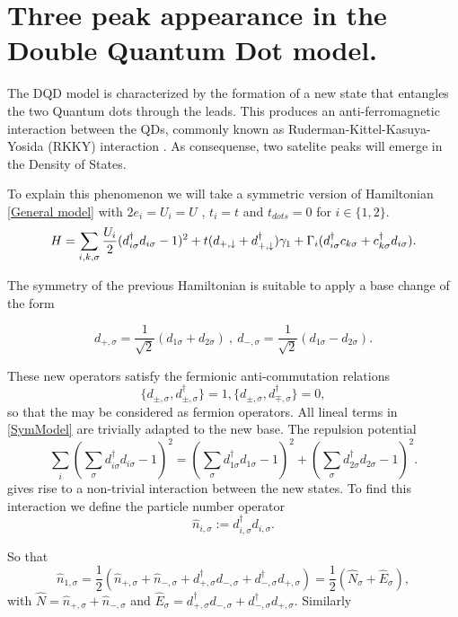 \chapter{Three peak appearance in the Double Quantum Dot model.\label{chap:DoublePeak.}}

The DQD model is characterized by the formation of 
a new state that entangles the two Quantum dots through the leads. This produces an anti-ferromagnetic interaction between the QDs, commonly known
as Ruderman-Kittel-Kasuya-Yosida (RKKY) interaction \citep{ruderman_indirect_1954,yosida_magnetic_1957}. As consequense, two satelite peaks will emerge in the Density of States.  




To explain this phenomenon we will take a symmetric version of Hamiltonian \eqref{General model} with $2e_i =U_i =U $ , $t_i = t$ and $t_{dots} = 0$ for $i \in \{ 1,2 \}$. 
\begin{equation}
H =\sum_{i,k,\sigma}  \frac{U_i}{2}(d_{i \sigma}^{\dagger}d_{i \sigma}-1)^{2} + t(d_{+,\downarrow}+d^\dagger_{+,\downarrow})\gamma_1 + \Gamma_i(d^\dagger_{i\sigma}c_{k\sigma}+c^\dagger_{k\sigma}d_{i\sigma}).
\label{SymModel}
\end{equation}

The symmetry of the previous Hamiltonian is suitable to apply a base change of the form 
 
\[
  d_{+ , \sigma} = \frac{1}{\sqrt{2}} (d_{1\sigma} +d_{2\sigma}) \ , \ 
  d_{- , \sigma} = \frac{1}{\sqrt{2}} (d_{1\sigma} -d_{2\sigma}).
\]


These new operators satisfy the fermionic anti-commutation relations 
 \[ \{d_{\pm , \sigma}, d^\dagger_{\pm , \sigma}\} = 1 , \{ d_{\pm , \sigma}, d^\dagger_{\mp , \sigma}\} = 0,
\]
 so that the may be considered as fermion operators. All lineal terms in \eqref{SymModel} are trivially adapted to the new base. The repulsion potential 
$$\sum_{i} (\sum_{\sigma} d_{i \sigma}^{\dagger}d_{i \sigma}-1)^{2} = (\sum_{\sigma} d_{1 \sigma}^{\dagger}d_{1 \sigma}-1)^{2} + (\sum_{\sigma} d_{2 \sigma}^{\dagger}d_{2 \sigma}-1)^{2} . $$ 
gives rise to a non-trivial interaction between the new states. To find this interaction we define the particle number operator  
\[\hat{n}_{i,\sigma}:= d^\dagger_{i,\sigma}d_{i,\sigma}.\] 

So that 
\[\hat{n}_{1,\sigma}= \frac{1}{2} \left( \hat{n}_{+,\sigma} + \hat{n}_{-,\sigma} + d^\dagger_{+,\sigma}d_{-,\sigma} + d^\dagger_{-,\sigma}d_{+,\sigma} \right) = \frac{1}{2} \left( \hat{N}_\sigma + \hat{E}_\sigma \right),  \]
with $\hat{N} = \hat{n}_{+,\sigma} + \hat{n}_{-,\sigma}$ and $\hat{E}_\sigma = d^\dagger_{+,\sigma}d_{-,\sigma} + d^\dagger_{-,\sigma}d_{+,\sigma}. $ Similarly 

